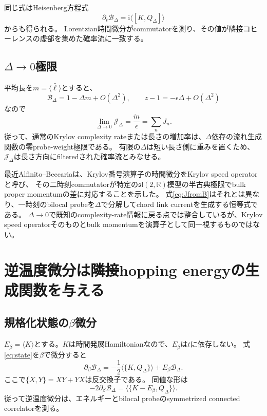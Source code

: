 \documentclass[a4paper,11pt]{ltjsarticle}
\numberwithin{equation}{section}
\newcommand{\ii}{\mathrm i}
\begin{document}
同じ式はHeisenberg方程式
\begin{equation}
 \partial_t\mathcal B_\Delta
 =\ii\langle[K,Q_\Delta]\rangle
 \label{eq:commutator}
\end{equation}
からも得られる。
Lorentzian時間微分がcommutatorを測り、その値が隣接コヒーレンスの虚部を集めた確率流に一致する。

\subsection{$\Delta\to0$極限}
平均長を$m=\langle\hat\ell\rangle$とすると、
\begin{equation}
 \mathcal B_\Delta=1-\Delta m+O(\Delta^2),\qquad
 z-1=-\epsilon\Delta+O(\Delta^2)
\end{equation}
なので
\begin{equation}
 \lim_{\Delta\to0}\mathcal J_\Delta
 =\frac{\dot m}{\epsilon}
 =\sum_nJ_n.
 \label{eq:limitJ}
\end{equation}
従って、通常のKrylov complexity rateまたは長さの増加率は、$\Delta$依存の流れ生成関数の零probe-weight極限である。
有限の$\Delta$は短い長さ側に重みを置くため、$\mathcal J_\Delta$は長さ方向にfilteredされた確率流とみなせる。

最近Alfinito--Beccariaは、Krylov番号演算子の時間微分をKrylov speed operatorと呼び、
その二時刻commutatorが特定の$\mathfrak{sl}(2,\mathbb R)$模型の半古典極限でbulk proper momentumの差に対応することを示した\cite{AlfinitoBeccaria}。
式\eqref{eq:JfromB}はそれとは異なり、一時刻のbilocal probeを$\Delta$で分解してchord link currentを生成する恒等式である。
$\Delta\to0$で既知のcomplexity-rate情報に戻る点では整合しているが、Krylov speed operatorそのものとbulk momentumを演算子として同一視するものではない。

\section{逆温度微分は隣接hopping energyの生成関数を与える}
\subsection{規格化状態の$\beta$微分}
$E_\beta=\langle K\rangle$とする。$K$は時間発展Hamiltonianなので、$E_\beta$は$t$に依存しない。
式\eqref{eq:state}を$\beta$で微分すると
\begin{equation}
 \partial_\beta\mathcal B_\Delta
 =-\frac12\langle\{K,Q_\Delta\}\rangle
 +E_\beta\mathcal B_\Delta.
 \label{eq:betaderivative}
\end{equation}
ここで$\{X,Y\}=XY+YX$は反交換子である。
同値な形は
\begin{equation}
 -2\partial_\beta\mathcal B_\Delta
 =\langle\{K-E_\beta,Q_\Delta\}\rangle.
 \label{eq:connected}
\end{equation}
従って逆温度微分は、エネルギーとbilocal probeのsymmetrized connected correlatorを測る。
\end{document}
